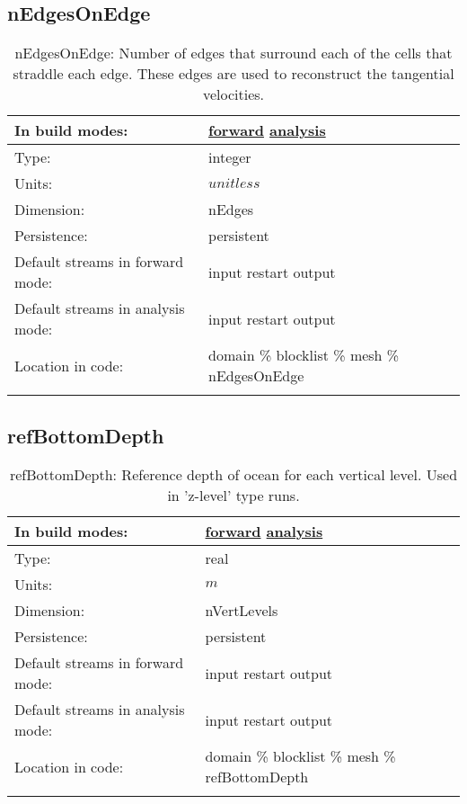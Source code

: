 \subsection[nEdgesOnEdge]{nEdgesOnEdge}
\label{subsec:var_sec_mesh_nEdgesOnEdge}
\begin{center}
\begin{longtable}{| p{2.0in} | p{4.0in} |}
        \hline 
        In build modes: & \hyperref[subsec:forward_var_tab_mesh]{forward} \hyperref[subsec:analysis_var_tab_mesh]{analysis} \\
        \hline 
        Type: & integer \\
        \hline 
        Units: & $unitless$ \\
        \hline 
        Dimension: & nEdges \\
        \hline 
        Persistence: & persistent \\
        \hline 
		 Default streams in forward mode: &  input restart output \\
        \hline 
		 Default streams in analysis mode: &  input restart output \\
        \hline 
		 Location in code: & domain \% blocklist \% mesh \% nEdgesOnEdge \\
		 \hline 
    \caption{nEdgesOnEdge: Number of edges that surround each of the cells that straddle each edge. These edges are used to reconstruct the tangential velocities.}
\end{longtable}
\end{center}
\subsection[refBottomDepth]{refBottomDepth}
\label{subsec:var_sec_mesh_refBottomDepth}
\begin{center}
\begin{longtable}{| p{2.0in} | p{4.0in} |}
        \hline 
        In build modes: & \hyperref[subsec:forward_var_tab_mesh]{forward} \hyperref[subsec:analysis_var_tab_mesh]{analysis} \\
        \hline 
        Type: & real \\
        \hline 
        Units: & $m$ \\
        \hline 
        Dimension: & nVertLevels \\
        \hline 
        Persistence: & persistent \\
        \hline 
		 Default streams in forward mode: &  input restart output \\
        \hline 
		 Default streams in analysis mode: &  input restart output \\
        \hline 
		 Location in code: & domain \% blocklist \% mesh \% refBottomDepth \\
		 \hline 
    \caption{refBottomDepth: Reference depth of ocean for each vertical level. Used in 'z-level' type runs.}
\end{longtable}
\end{center}
